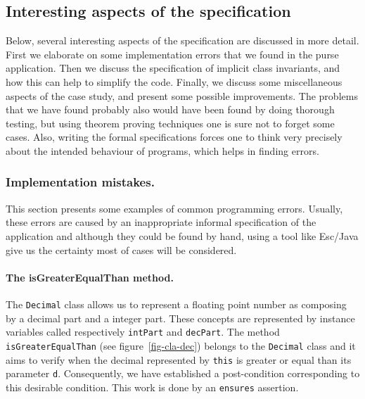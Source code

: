 \documentclass[a4paper]{llncs}
\begin{document}
\subsection{Interesting aspects of the specification}\label{SectSpecDetails}
Below, several interesting aspects of the specification are discussed
in more detail. First we elaborate on some implementation errors
that we found in the purse application.  Then we discuss the
specification of implicit class invariants, and how this can help to
simplify the code. Finally, we discuss some miscellaneous aspects of
the case study, and present some possible improvements. The problems
that we have found probably also would have been found by doing
thorough testing, but using theorem proving techniques one is sure not
to forget some cases. Also, writing the formal specifications forces
one to think very precisely about the intended behaviour of programs,
which helps in finding errors.






\subsubsection{Implementation mistakes.}
This section presents some examples of common programming
errors. Usually, these errors are caused by an inappropriate informal
specification of the application and although they could be found by
hand, using a tool like Esc/Java give us the certainty most of cases
will be considered.


\paragraph{The isGreaterEqualThan method.}

The \texttt{Decimal} class allows us to
represent a floating point number as
composing by a decimal part and a integer part. These concepts are
represented by instance variables called respectively \texttt{intPart}
and \texttt{decPart}. The
method \texttt{isGreaterEqualThan} (see figure~\ref{fig-cla-dec})
belongs to the \texttt{Decimal} class and it aims to verify when the
decimal represented by \texttt{this} is greater or equal than its parameter
\texttt{d}. Consequently, we have established a post-condition
corresponding to this desirable condition. This work is done by an
\texttt{ensures} assertion.
\end{document}
